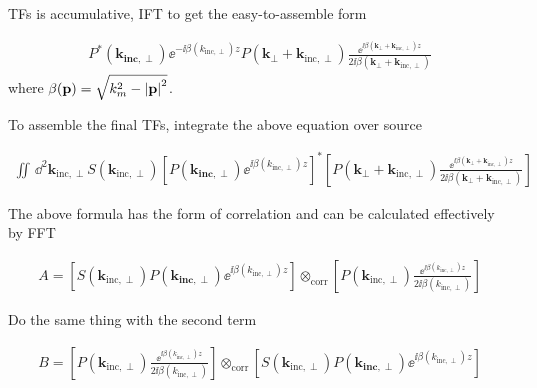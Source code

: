 \documentclass{mynotes}
\begin{document}
TFs is accumulative, IFT to get the easy-to-assemble form

\begin{equation}
	\begin{aligned}
		P^*(\mathbf{k_{\text{inc}, \perp}})\ee^{-\ii \beta(k_{\text{inc}, \perp}) z}
		P(\mathbf{k}_{\perp}+\mathbf{k}_{\text{inc}, \perp})
		\frac{\ee^{\ii \beta(\mathbf{k}_{\perp}+\mathbf{k}_{\text{inc}, \perp}) z}}
		{2 \ii \beta(\mathbf{k}_{\perp}+\mathbf{k}_{\text{inc}, \perp})}
	\end{aligned}
\end{equation}
where $\beta(\mathbf{p}) = \sqrt{k_m^2 - \abs{\mathbf{p}}^2}$.

To assemble the final TFs, integrate the above equation over source

\begin{equation}
	\begin{aligned}
		\iint\,\dd^2 \mathbf{k}_{\text{inc}, \perp} S(\mathbf{k}_{\text{inc}, \perp})
		\left[ P(\mathbf{k_{\text{inc}, \perp}})\ee^{\ii \beta(k_{\text{inc}, \perp}) z} \right]^*
		\left[ P(\mathbf{k}_{\perp}+\mathbf{k}_{\text{inc}, \perp})
			\frac{\ee^{\ii \beta(\mathbf{k}_{\perp}+\mathbf{k}_{\text{inc}, \perp}) z}}
			{2 \ii \beta(\mathbf{k}_{\perp}+\mathbf{k}_{\text{inc}, \perp})} \right]
	\end{aligned}
\end{equation}

The above formula has the form of correlation and can be calculated
effectively by FFT

\begin{equation}
	\begin{aligned}
		A = \left[S(\mathbf{k}_{\text{inc}, \perp})
			P(\mathbf{k_{\text{inc}, \perp}})\ee^{\ii \beta(k_{\text{inc}, \perp}) z}\right]
		\otimes_{\text{corr}} \left[ P(\mathbf{k}_{\text{inc}, \perp})
			\frac{\ee^{\ii \beta(k_{\text{inc}, \perp}) z}}
			{2 \ii \beta(k_{\text{inc}, \perp})} \right]
	\end{aligned}
\end{equation}

Do the same thing with the second term

\begin{equation}
	\begin{aligned}
		B = \left[ P(\mathbf{k}_{\text{inc}, \perp})
			\frac{\ee^{\ii \beta(k_{\text{inc}, \perp}) z}}
			{2 \ii \beta(k_{\text{inc}, \perp})} \right]
		\otimes_{\text{corr}}
		\left[S(\mathbf{k}_{\text{inc}, \perp})
			P(\mathbf{k_{\text{inc}, \perp}})\ee^{\ii \beta(k_{\text{inc}, \perp}) z}\right]
	\end{aligned}
\end{equation}
\end{document}
